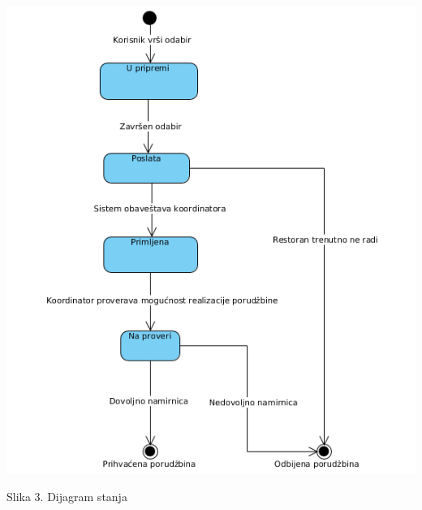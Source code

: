 \includegraphics[width=136mm]{slike/Upravljanje_porudzbinom.png}\\
\begin{center}
\caption{Slika 3. Dijagram stanja}\\
\end{center}

 
 
